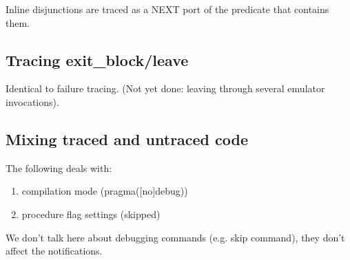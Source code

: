 Inline disjunctions are traced as a NEXT port of the predicate that
contains them.


\subsection{Tracing exit_block/leave}

Identical to failure tracing.
(Not yet done: leaving through several emulator invocations).


\subsection{Mixing traced and untraced code}

The following deals with:
\begin{enumerate}
\item compilation mode (pragma([no]debug))
\item procedure flag settings (skipped)
\end{enumerate}
We don't talk here about debugging commands (e.g. skip command),
they don't affect the notifications.

% 
% 
% 
% 
% 
% 
% 
% 

